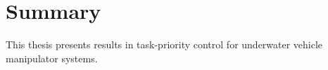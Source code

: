 \chapter*{Summary}
This thesis presents results in task-priority control for underwater vehicle manipulator systems.